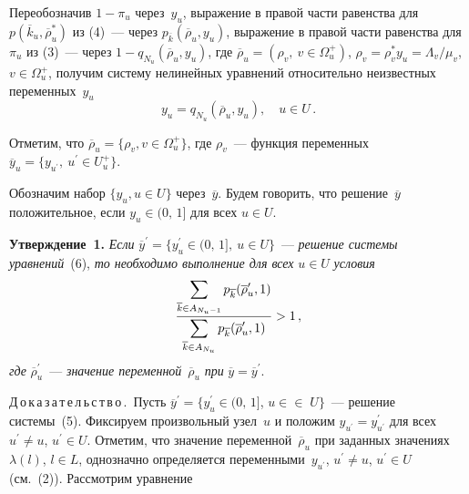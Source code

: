 \begin{multicols}{2}
     Переобозначив $1-\pi_u$ через~$y_u$, выражение в правой части 
равенства для~$p(\overline{k}_u, \overline{\rho}_u^*)$ из (4)~--- через 
$p_{\overline{k}}(\overline{\rho}_u, y_u)$, выражение в правой части равенства 
для~$\pi_u$ из (3)~--- через $1-q_{N_u}(\overline{\rho}_u, y_u)$, где 
$\overline{\rho}_u = (\rho_v, \ v\in\Omega_u^+)$, $\rho_v = \rho_v^* y_u = 
\Lambda_v/\mu_v$, $v\in\Omega_u^+$, получим систему нелинейных уравнений 
относительно неизвестных переменных~$y_u$
     \begin{equation}
     y_u = q_{N_u}\left ( \overline{\rho}_u,y_u\right ),\quad u\in U\,.
     \end{equation}
     
     Отметим, что $\overline{\rho}_u = \{\rho_v, v\in\Omega_u^+\}$, где 
$\rho_v$~--- функция переменных $\overline{y}_u =\{y_{u^\prime},\ u^\prime \in 
U_u^+\}$.
     
     Обозначим набор $\{y_u, u\in U\}$ через~$\overline{y}$. Будем говорить, 
что решение~$\overline{y}$ положительное, если $y_u\in (0,\,1]$ для всех $u\in 
U$.
     
     \medskip
     
     \noindent
     \textbf{Утверждение~1.} \textit{Если} 
     $\overline{y}^\prime = \{y_u^\prime \in (0,\,1],\ u\in U\}$~--- \textit{решение 
системы уравнений}~(6), \textit{то необходимо выполнение для всех} $u\in U$ 
\textit{условия}
     \begin{equation}
     \displaystyle\frac{\displaystyle \sum\limits_{\overline{k}\in A_{N_u-1}} 
p_{\overline{k}}(\overline{\rho}_u^\prime , 1)\mathstrut}{\displaystyle \sum\limits_{\overline{k}\in A_{N_u}} 
p_{\overline{k}}(\overline{\rho}_u^\prime, 1)\mathstrut} >1\,,
     \label{e7ag}
     \end{equation}
     \textit{где} $\overline{\rho}_u^\prime$~--- \textit{значение 
переменной}~$\overline{\rho}_u$ \textit{при} $\overline{y} 
=\overline{y}^\prime$.
     
     
     \noindent
     Д\,о\,к\,а\,з\,а\,т\,е\,л\,ь\,с\,т\,в\,о\,.\ Пусть $\overline{y}^\prime = 
\{y_u^\prime \in (0,\,1]$, $u\in$\linebreak $\in\; U\}$~--- решение системы~(5). Фиксируем 
произвольный узел~$u$ и положим $y_{u^\prime} = y^\prime_{u^\prime}$ для всех 
$u^\prime\not= u$, $u^\prime\in U$. Отметим, что значение 
переменной~$\overline{\rho}_u$ при заданных значениях~$\lambda(l)$, $l\in L$, 
однозначно определяется переменными~$y_{u^\prime}$, $u^\prime\not= u$, 
$u^\prime\in U$ (см.~(2)). Рассмотрим уравнение


\end{multicols}
